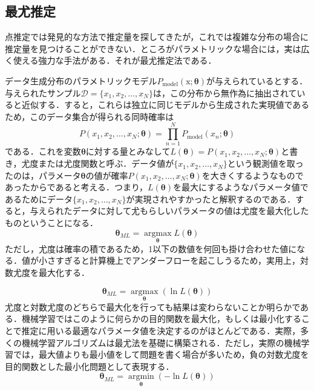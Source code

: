 \documentclass[a4paper,11pt]{jsreport}
\begin{document}
\subsection{最尤推定}
点推定では発見的な方法で推定量を探してきたが，これでは複雑な分布の場合に推定量を見つけることができない．ところがパラメトリックな場合には，実は広く使える強力な手法がある．それが最尤推定法である．\par
データ生成分布のパラメトリックモデル$P_{\text{model}}(\mathrm{x}; \bm{\theta})$が与えられているとする．与えられたサンプル$\mathcal{D} = \{x_1, x_2, \dots, x_N\}$は，この分布から無作為に抽出されていると近似する．すると，これらは独立に同じモデルから生成された実現値であるため，このデータ集合が得られる同時確率は
\begin{equation*}
  P(x_1, x_2, \dots, x_N; \bm{\theta}) 
  = \prod_{n=1}^N P_{\text{model}}(x_n; \bm{\theta})
\end{equation*}
である．これを変数$\bm{\theta}$に対する量とみなして$L(\bm{\theta}) = P(x_1, x_2, \dots, x_N; \bm{\theta})$と書き，尤度または尤度関数と呼ぶ．データ値が$\{ x_1, x_2, \dots, x_N \}$という観測値を取ったのは，パラメータ$\bm{\theta}$の値が確率$P(x_1, x_2, \dots, x_N; \bm{\theta})$を大きくするようなものであったからであると考える．つまり，$L(\bm{\theta})$を最大にするようなパラメータ値であるためにデータ$\{ x_1, x_2, \dots, x_N \}$が実現されやすかったと解釈するのである．すると，与えられたデータに対して尤もらしいパラメータの値は尤度を最大化したものということになる．
\begin{equation}
  \bm{\theta}_{ML} = \underset{\bm{\theta}} {\operatorname{argmax}} L(\bm{\theta})
\end{equation}
ただし，尤度は確率の積であるため，1以下の数値を何回も掛け合わせた値になる．値が小さすぎると計算機上でアンダーフローを起こしうるため，実用上，対数尤度を最大化する．\par
\begin{equation}
  \bm{\theta}_{ML} = \underset{\bm{\theta}} {\operatorname{argmax}} (\ln{L(\bm{\theta})})
\end{equation}
尤度と対数尤度のどちらで最大化を行っても結果は変わらないことか明らかである．機械学習ではこのように何らかの目的関数を最大化，もしくは最小化することで推定に用いる最適なパラメータ値を決定するのがほとんどである．実際，多くの機械学習アルゴリズムは最尤法を基礎に構築される．ただし，実際の機械学習では，最大値よりも最小値をして問題を書く場合が多いため，負の対数尤度を目的関数とした最小化問題として表現する．
\begin{equation}
  \bm{\theta}_{ML} = \underset{\bm{\theta}} {\operatorname{argmin}} (-\ln{L(\bm{\theta})})
\end{equation}
\end{document}
